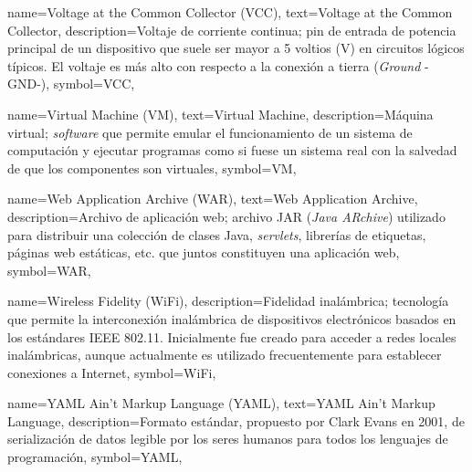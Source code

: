 {
    name={Voltage at the Common Collector (VCC)},
    text={Voltage at the Common Collector},
    description={Voltaje de corriente continua; pin de entrada de potencia principal de un dispositivo que suele ser mayor a 5 voltios (V) en circuitos lógicos típicos. El voltaje es más alto con respecto a la conexión a tierra (\textit{Ground} -GND-)},
    symbol={VCC},
}

{
    name={Virtual Machine (VM)},
    text={Virtual Machine},
    description={Máquina virtual; \textit{software} que permite emular el funcionamiento de un sistema de computación y ejecutar programas como si fuese un sistema real con la salvedad de que los componentes son virtuales},
    symbol={VM},
}
	
{
    name={Web Application Archive (WAR)},
    text={Web Application Archive},
    description={Archivo de aplicación web; archivo JAR (\textit{Java ARchive}) utilizado para distribuir una colección de clases Java,  \textit{servlets}, librerías de etiquetas, páginas web estáticas, etc. que juntos constituyen una aplicación web},
	symbol={WAR},
}

{
    name={Wireless Fidelity (WiFi)},
    description={Fidelidad inalámbrica; tecnología que permite la interconexión inalámbrica de dispositivos electrónicos basados en los estándares IEEE 802.11. Inicialmente fue creado para acceder a redes locales inalámbricas, aunque actualmente es utilizado frecuentemente para establecer conexiones a Internet},
    symbol={WiFi},
}

{
    name={YAML Ain't Markup Language (YAML)},
    text={YAML Ain't Markup Language},
    description={Formato estándar, propuesto por Clark Evans en 2001, de serialización de datos legible por los seres humanos para todos los lenguajes de programación},
    symbol={YAML},
}

